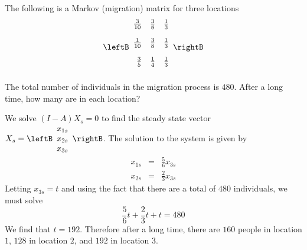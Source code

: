\begin{enumialphparenastyle}
\begin{ex} The following is a Markov (migration) matrix for three locations
\begin{equation*}
\leftB
\begin{array}{rrr}
\vspace{0.05in}\frac{3}{10} & \vspace{0.05in}\frac{3}{8} & \vspace{0.05in}\frac{1}{3} \\
\vspace{0.05in}\frac{1}{10} & \vspace{0.05in}\frac{3}{8} & \vspace{0.05in}\frac{1}{3} \\
\vspace{0.05in}\frac{3}{5} & \vspace{0.05in}\frac{1}{4} & \vspace{0.05in}\frac{1}{3}
\end{array}
\rightB
\end{equation*}
The total number of individuals in the migration process is $480$. After a
long time, how many are in each location?
\begin{sol}
We solve $(I-A)X_s = 0$ to find the steady state vector $X_s = \leftB \begin{array}{c}
x_{1s} \\
x_{2s} \\
x_{3s} 
\end{array}
\rightB$.
The solution to the system is given by 
\begin{eqnarray*}
x_{1s} &=& \frac{5}{6} x_{3s} \\
x_{2s} &=& \frac{2}{3} x_{3s}
\end{eqnarray*}
Letting $x_{3s} = t$ and using the fact that there are a total of $480$ individuals, we must solve
\[
\frac{5}{6} t + \frac{2}{3} t + t = 480
\]
We find that $t=192$. Therefore after a long time, there are $160$ people in location $1$, $128$ in location $2$, and $192$ in location $3$. 
\end{sol}
\end{ex}


\end{enumialphparenastyle}

